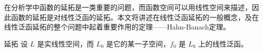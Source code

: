
在分析学中函数的延拓是一类重要的问题，而函数空间可以用线性空间来描述，因此函数的延拓是对线性泛函的延拓。本文将讲述在线性泛函延拓的一般概念，及在线性泛函延拓的整个问题中起着重要作用的定理——Hahn-Banach定理。

\begin{definition}{延拓}
设 $L$ 是实线性空间，而 $L_0$ 是它的某一子空间，$f_0$ 是 $L_0$ 上的线性泛函。
\end{definition}



